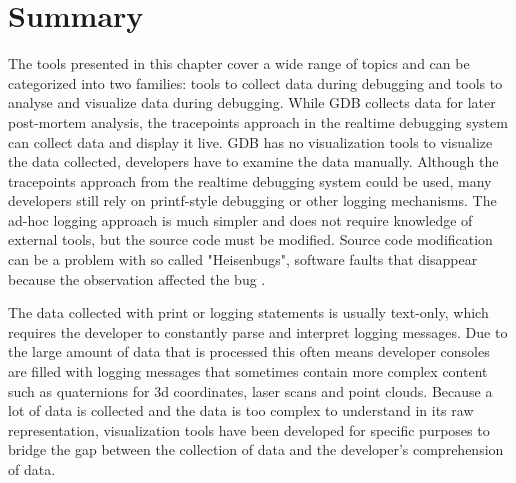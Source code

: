 

\section{Summary}

The tools presented in this chapter cover a wide range of topics and can be categorized into two families: tools to collect data during debugging and tools to analyse and visualize data during debugging. While GDB collects data for later post-mortem analysis, the tracepoints approach in the realtime debugging system can collect data and display it live. GDB has no visualization tools to visualize the data collected, developers have to examine the data manually. Although the tracepoints approach from the realtime debugging system \cite{Gumbley2009} could be used, many developers still rely on printf-style debugging or other logging mechanisms. The ad-hoc logging approach is much simpler and does not require knowledge of external tools, but the source code must be modified. Source code modification can be a problem with so called "Heisenbugs", software faults that disappear because the observation affected the bug \cite{Grottke2005}.

The data collected with print or logging statements is usually text-only, which requires the developer to constantly parse and interpret logging messages. Due to the large amount of data that is processed this often means developer consoles are filled with logging messages that sometimes contain more complex content such as quaternions for 3d coordinates, laser scans and point clouds. Because a lot of data is collected and the data is too complex to understand in its raw representation, visualization tools have been developed for specific purposes to bridge the gap between the collection of data and the developer's comprehension of data.

